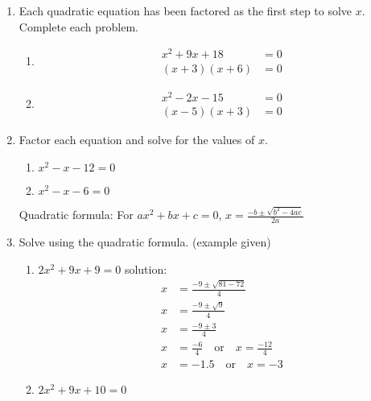 \documentclass[12pt, twoside]{article}
\begin{document}
\begin{enumerate}
\newpage
\item Each quadratic equation has been factored as the first step to solve $x$. Complete each problem.
\begin{multicols}{2}
  \begin{enumerate}[itemsep=5cm]
    \item \begin{align*}
      x^2 + 9x + 18 &= 0 \\
      (x + 3)(x + 6) &= 0
      \end{align*}
    \item
      \begin{align*}
        x^2 - 2x - 15 &= 0 \\
        (x - 5)(x + 3) &= 0
      \end{align*}
  \end{enumerate}
  \end{multicols} \vspace{2cm}

\item Factor each equation and solve for the values of $x$.
\begin{multicols}{2}
  \begin{enumerate}[itemsep=5cm]
    \item $x^2-x-12=0$
    \item $x^2-x-6=0$
  \end{enumerate}
  \end{multicols} \vspace{5cm}

Quadratic formula: For $ax^2+bx+c=0$, $\displaystyle x=\frac{-b \pm \sqrt{b^2-4ac}}{2a}$
\item Solve using the quadratic formula. (example given)
\begin{multicols}{2}
  \begin{enumerate}[itemsep=5cm]
    \item $2x^2 + 9x + 9 = 0$ solution:
      \begin{align*}
        x &= \frac{-9 \pm \sqrt{81 - 72}}{4} \\
        x &= \frac{-9 \pm \sqrt{9}}{4} \\
        x &= \frac{-9 \pm 3}{4} \\
        x &= \frac{-6}{4} \quad \text{or} \quad x = \frac{-12}{4} \\
        x &= -1.5 \quad \text{or} \quad x = -3
      \end{align*}
    \item $2x^2 + 9x + 10 = 0$
  \end{enumerate}
  \end{multicols} \vspace{4cm}


\end{enumerate}
\end{document}
